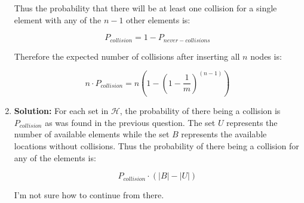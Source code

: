 \documentclass{article}
\begin{document}
\begin{enumerate}
    Thus the probability that there will be at least one collision for a single
    element with any of the $n-1$ other elements is:

    $$ P_{collision} = 1 - P_{never-collisions} $$

    Therefore the expected number of collisions after inserting all $n$ nodes
    is:

    $$ n \cdot P_{collision} = n\left(1-\left(1-\frac{1}{m}\right)^{(n-1)}\right) $$

    \item \textbf{Solution:}
    For each set in $ \mathscr{H} $, the probability of there being a collision
    is $P_{collision}$ as was found in the previous question. The set $U$
    represents the number of available elements while the set $B$ represents the
    available locations without collisions. Thus the probability of there being
    a collision for any of the elements is:

    $$ P_{collision} \cdot \left( | B | - | U | \right) $$

    I'm not sure how to continue from there.
\end{enumerate}
\end{document}
